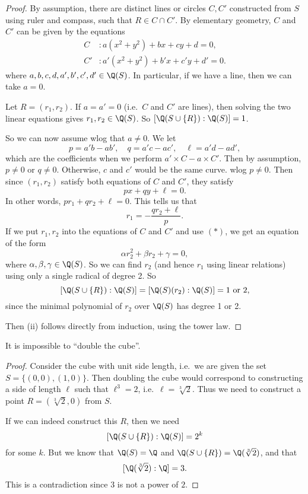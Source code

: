 \documentclass[a4paper]{article}
\begin{document}
\begin{proof}
  By assumption, there are distinct lines or circles $C, C'$ constructed from $S$ using ruler and compass, such that $R\in C\cap C'$. By elementary geometry, $C$ and $C'$ can be given by the equations
  \begin{align*}
    C&: a(x^2 + y^2) + bx + cy + d = 0,\\
    C'&: a'(x^2 + y^2) + b'x + c'y + d' = 0.
  \end{align*}
  where $a, b, c, d, a', b', c', d' \in \Q(S)$. In particular, if we have a line, then we can take $a = 0$.

  Let $R = (r_1, r_2)$. If $a = a' = 0$ (i.e.\ $C$ and $C'$ are lines), then solving the two linear equations gives $r_1, r_2 \in \Q(S)$. So $[\Q(S\cup \{R\}):\Q(S)] = 1$.

  So we can now assume wlog that $a\not = 0$. We let
  \[
    p = a'b - ab',\quad q = a'c - ac',\quad \ell = a'd - ad',
  \]
  which are the coefficients when we perform $a'\times C - a \times C'$. Then by assumption, $p \not= 0$ or $q \not= 0$. Otherwise, $c$ and $c'$ would be the same curve. wlog $p \not= 0$. Then since $(r_1, r_2)$ satisfy both equations of $C$ and $C'$, they satisfy
  \[
    px + qy + \ell = 0.
  \]
  In other words, $pr_1 + qr_2 + \ell = 0$. This tells us that
  \[
    r_1 = -\frac{qr_2 + \ell}{p}.\tag{$*$}
  \]
  If we put $r_1, r_2$ into the equations of $C$ and $C'$ and use $(*)$, we get an equation of the form
  \[
    \alpha r_2^2 + \beta r_2 + \gamma = 0,
  \]
  where $\alpha, \beta, \gamma \in \Q(S)$. So we can find $r_2$ (and hence $r_1$ using linear relations) using only a single radical of degree 2. So
  \[
    [\Q(S\cup \{R\}):\Q(S)] = [\Q(S)(r_2): \Q(S)] = 1\text{ or }2,
  \]
  since the minimal polynomial of $r_2$ over $\Q(S)$ has degree 1 or 2.

  Then (ii) follows directly from induction, using the tower law.
\end{proof}

\begin{cor}
  It is impossible to ``double the cube''.
\end{cor}

\begin{proof}
  Consider the cube with unit side length, i.e.\ we are given the set $S = \{(0, 0), (1, 0)\}$. Then doubling the cube would correspond to constructing a side of length $\ell$ such that $\ell^3 = 2$, i.e.\ $\ell = \sqrt[3]{2}$. Thus we need to construct a point $R = (\sqrt[3]{2}, 0)$ from $S$.

  If we can indeed construct this $R$, then we need
  \[
    [\Q(S\cup \{R\}):\Q(S)] = 2^k
  \]
  for some $k$. But we know that $\Q(S) = \Q$ and $\Q(S\cup \{R\}) = \Q(\sqrt[3]{2})$, and that
  \[
    [\Q(\sqrt[3]{2}):\Q] = 3.
  \]
  This is a contradiction since $3$ is not a power of $2$.
\end{proof}
\end{document}
